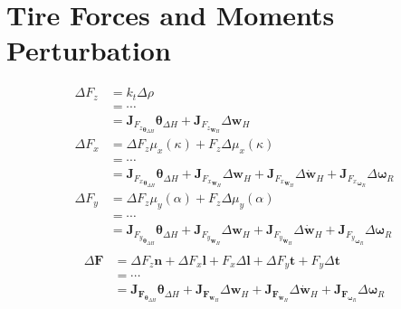\section{Tire Forces and Moments Perturbation}
\begin{equation}
    \begin{split}
        \Delta F_z &= k_t \Delta \rho\\
        &= \cdots \\
        &= \mathbf{J}_{{F_z}_{\boldsymbol{\theta}_{\Delta H}}}\boldsymbol{\theta}_{\Delta H} + \mathbf{J}_{{F_z}_{\mathbf{w}_H}}\Delta \mathbf{w}_H\\
        \Delta F_x &= \Delta F_z \mu_x(\kappa) + F_z \Delta \mu_x(\kappa)\\
        &= \cdots \\
        &= \mathbf{J}_{{F_x}_{\boldsymbol{\theta}_{\Delta H}}}\boldsymbol{\theta}_{\Delta H} + \mathbf{J}_{{F_x}_{\mathbf{w}_H}}\Delta \mathbf{w}_H + \mathbf{J}_{{F_x}_{\dot{\mathbf{w}}_H}}\Delta {\dot{\mathbf{w}}}_H + \mathbf{J}_{{F_x}_{\boldsymbol{\omega}_R}}\Delta \boldsymbol{\omega}_R\\
        \Delta F_y &= \Delta F_z \mu_y(\alpha) + F_z \Delta \mu_y(\alpha)\\
        &= \cdots \\
        &= \mathbf{J}_{{F_y}_{\boldsymbol{\theta}_{\Delta H}}}\boldsymbol{\theta}_{\Delta H} + \mathbf{J}_{{F_y}_{\mathbf{w}_H}}\Delta \mathbf{w}_H + \mathbf{J}_{{F_y}_{\dot{\mathbf{w}}_H}}\Delta {\dot{\mathbf{w}}}_H + \mathbf{J}_{{F_y}_{\boldsymbol{\omega}_R}}\Delta \boldsymbol{\omega}_R\\
    \end{split}
\end{equation}
\begin{equation}
    \begin{split}
        \Delta \mathbf{F} &= \Delta F_z \mathbf{n} + \Delta F_x \mathbf{l} + F_x \Delta \mathbf{l} + \Delta F_y \mathbf{t} + F_y \Delta \mathbf{t}\\
        &= \cdots \\
        &= \mathbf{J}_{\mathbf{F}_{\boldsymbol{\theta}_{\Delta H}}}\boldsymbol{\theta}_{\Delta H} + \mathbf{J}_{\mathbf{F}_{\mathbf{w}_H}}\Delta \mathbf{w}_H + \mathbf{J}_{\mathbf{F}_{\dot{\mathbf{w}}_H}}\Delta {\dot{\mathbf{w}}}_H + \mathbf{J}_{\mathbf{F}_{\boldsymbol{\omega}_R}}\Delta \boldsymbol{\omega}_R\\
    \end{split}
\end{equation}
